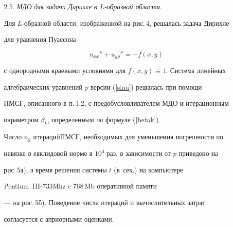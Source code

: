 \medskip





2.5. {\it МДО для задачи Дирихле в $L$-образной области}.


Для $L$-образной области, изображенной на рис.\,4, решалась задача Дирихле 


для уравнения Пуассона


\begin{equation}


\label{pois} u_{xx}'' + u_{yy}''=-f(x,y)


\end{equation}


с однородными краевыми условиями для $f(x,y)\equiv 1$. Система линейных 


алгебраических уравнений $p$-версии (\ref{slau}) решалась при помощи 


ПМСГ, описанного в п.\,1.2, с предобусловливателем МДО и итерационным 


параметром $\beta_k$, определенным по формуле (\ref{betak}).


Число $n_g$ итераций\linebreak ПМСГ, необходимых для уменьшения погрешности по 


невязке в евклидовой норме в $10^4$ раз, в зависимости от $p$ приведено на


рис.\,5а), а время решения системы $t$ (в~сек.) на компьютере 


Pentium~III-733\;Mhz c 768\,Mb оперативной памяти


--- на рис.\,5б). Поведение числа итераций и вычислительных затрат 


согласуется с априорными оценками.






















